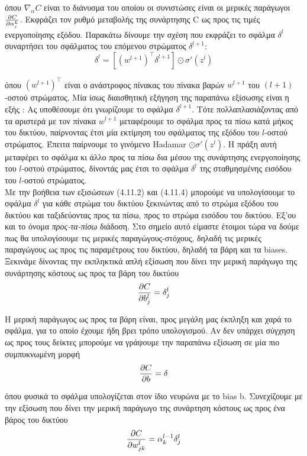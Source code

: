 \documentclass[11pt]{article} %
\numberwithin{equation}{subsection}
\begin{document}
όπου $\nabla_{\alpha}C$ είναι το διάνυσμα του οποίου οι συνιστώσες είναι οι μερικές παράγωγοι $\pdv{C}{\alpha_{j}^{L}}$. Εκφράζει τον ρυθμό μεταβολής της συνάρτησης C ως προς τις τιμές ενεργοποίησης εξόδου. Παρακάτω δίνουμε την σχέση που εκφράζει το σφάλμα $\delta^{l}$ συναρτήσει του σφάλματος του επόμενου στρώματος $\delta^{l+1}$:
\begin{equation}
\delta^{l} = \left[(w^{l+1})^\intercal \delta^{l+1}\right] \odot \sigma'(z^{l})
\end{equation}

όπου $(w^{l+1})^\intercal$ είναι ο ανάστροφος πίνακας του πίνακα βαρών $w^{l+1}$ του $(l+1)$-οστού στρώματος. Μία ίσως διαισθητική εξήγηση της παραπάνω εξίσωσης είναι η εξής \cite{neuralnets3}: Ας υποθέσουμε ότι γνωρίζουμε το σφάλμα $\delta^{l+1}$. Τότε πολλαπλασιάζοντας από τα αριστερά με τον πίνακα  $w^{l+1}$ μεταφέρουμε το σφάλμα προς τα πίσω κατά μήκος του δικτύου, παίρνοντας έτσι μία εκτίμηση του σφάλματος της εξόδου του $l$-οστού στρώματος. Έπειτα παίρνουμε το γινόμενο Hadamar $\odot \sigma'(z^{l})$. Η πράξη αυτή μεταφέρει το σφάλμα κι άλλο προς τα πίσω δια μέσου της συνάρτησης ενεργοποίησης του $l$-οστού στρώματος, δίνοντάς μας έτσι το σφάλμα $\delta^{l}$ της σταθμησμένης εισόδου του $l$-οστού στρώματος. \\

Με την βοήθεια των εξισώσεων (4.11.2) και (4.11.4) μπορούμε να υπολογίσουμε το σφάλμα $\delta^{l}$ για κάθε στρώμα του δικτύου ξεκινώντας από το στρώμα εξόδου του δικτύου και ταξιδεύοντας προς τα πίσω, προς το στρώμα εισόδου του δικτύου. Εξ'ου και το όνομα \textit{προς-τα-πίσω} διάδοση. Στο σημείο αυτό είμαστε έτοιμοι τώρα να δούμε πως θα υπολογίσουμε τις μερικές παραγώγους-στόχους, δηλαδή τις μερικές παραγώγους ως προς τις παραμέτρους του δικτύου, δηλαδή τα βάρη και τα biases. Ξεκινάμε δίνοντας την εκπληκτικά απλή εξίσωση που δίνει την μερική παράγωγο της συνάρτησης κόστους ως προς τα βάρη του δικτύου
\begin{equation}
\pdv{C}{b_{j}^{l}} = \delta_{j}^{l}
\end{equation}

Η μερική παράγωγος ως προς τα βάρη είναι, προς μεγάλη μας έκπληξη και χαρά το σφάλμα, για το οποίο έχουμε ήδη βρει τρόπο υπολογισμού. Αν δεν υπάρχει σύγχηση ως προς τους δείκτες μπορούμε να γράψουμε την παραπάνω εξίσωση σε μία πιο συμπυκνωμένη μορφή
\begin{equation}
\pdv{C}{b} = \delta
\end{equation}

όπου φυσικά το σφάλμα \delta υπολογίζεται στον ίδιο νευρώνα με το bias b. Συνεχίζουμε με την εξίσωση που δίνει την μερική παράγωγο της συνάρτηση κόστους ως προς ένα βάρος του δικτύου
\begin{equation}
\pdv{C}{w_{jk}^{l}} = \alpha_{k}^{l-1} \delta_{j}^{l}
\end{equation}
\end{document}

